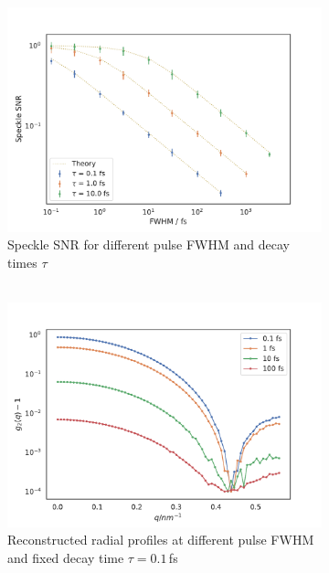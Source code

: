 \begin{figure}
	\begin{subfigure}[b]{0.32\textwidth}
		\includegraphics[width=\linewidth]{images/timedependent_1.pdf}
	\caption{Speckle SNR for different pulse FWHM and decay times $\tau$\\$ $}
	\end{subfigure}
	\begin{subfigure}[b]{0.32\textwidth}
		\includegraphics[width=\linewidth]{images/tdsphere.pdf}
		\caption{Reconstructed radial profiles at different pulse FWHM and fixed decay time $\tau = 0.1$\,fs}
	\end{subfigure}
	\begin{subfigure}[b]{0.32\textwidth}

\end{subfigure}
\end{figure}
